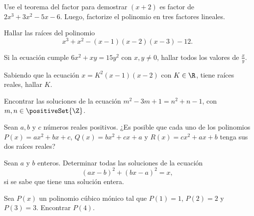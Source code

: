 \begin{multicols}{2}
    \begin{exercise}
        Use el teorema del factor para demostrar $(x + 2)$ es factor de $2x^3 + 3x^2 - 5x - 6$.
        Luego, factorize el polinomio en tres factores lineales.
    \end{exercise}

    \begin{exercise}
        Hallar las raíces del polinomio
        \[
            x^3 + x^2 - (x - 1)(x - 2)(x - 3) - 12.
        \]
    \end{exercise}

    \begin{exercise}
        Si la ecuación cumple $6x^2 + xy = 15y^2$ con $x, y \neq 0$, hallar todos los valores de $\frac{x}{y}$.
    \end{exercise}

    \begin{exercise}
        Sabiendo que la ecuación $x = K^2(x - 1)(x - 2)$ con $K \in \R$, tiene raíces reales, hallar $K$.
    \end{exercise}

    \begin{exercise}
        Encontrar las soluciones de la ecuación $m^2 - 3m + 1 = n^2 + n - 1$, con $m, n \in \positiveSet{\Z}$.
    \end{exercise}

    \begin{problem}
        Sean $a, b$ y $c$ números reales positivos.
        ¿Es posible que cada uno de los polinomios $P(x) = ax^2 + bx + c$, $Q(x) = bx^2 + cx + a$ y $R(x) = cx^2 + ax + b$ tenga sus dos raíces reales?
    \end{problem}

    \begin{problem}
        Sean $a$ y $b$ enteros.
        Determinar todas las soluciones de la ecuación
        \[
            (ax - b)^2 + (bx - a)^2 =  x,
        \] si se sabe que tiene una solución entera.
    \end{problem}

    \begin{problem}
        Sea $P(x)$ un polinomio cúbico mónico tal que $P(1) = 1$, $P(2) = 2$ y $P(3) = 3$.
        Encontrar $P(4).$
    \end{problem}
\end{multicols}